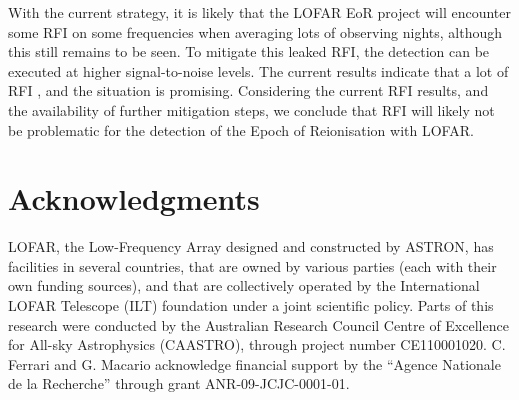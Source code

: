 \documentclass[useAMS,usenatbib]{mn2e}
\newcommand{\editmark}[1]{{\color{red}{\textbf{#1}}}}
\begin{document}
With the current strategy, it is likely that the LOFAR EoR project will encounter some RFI on some frequencies when averaging lots of observing nights, although this still remains to be seen. To mitigate this leaked RFI, the detection can be executed at higher signal-to-noise levels. The current results indicate that a lot of RFI \editmark{does not add up consistently}, and the situation is promising. Considering the current RFI results, and the availability of further mitigation steps, we conclude that RFI will likely not be problematic for the detection of the Epoch of Reionisation with LOFAR.

\section*{Acknowledgments}
LOFAR, the Low-Frequency Array designed and constructed by ASTRON, has facilities in several countries, that are owned by various parties (each with their own funding sources), and that are collectively operated by the International LOFAR Telescope (ILT) foundation under a joint scientific policy. Parts of this research were conducted by the Australian Research Council Centre of Excellence for All-sky Astrophysics (CAASTRO), through project number CE110001020. C. Ferrari and G. Macario acknowledge financial support by the ``Agence Nationale de la Recherche'' through grant ANR-09-JCJC-0001-01.




\label{lastpage}
\end{document}
